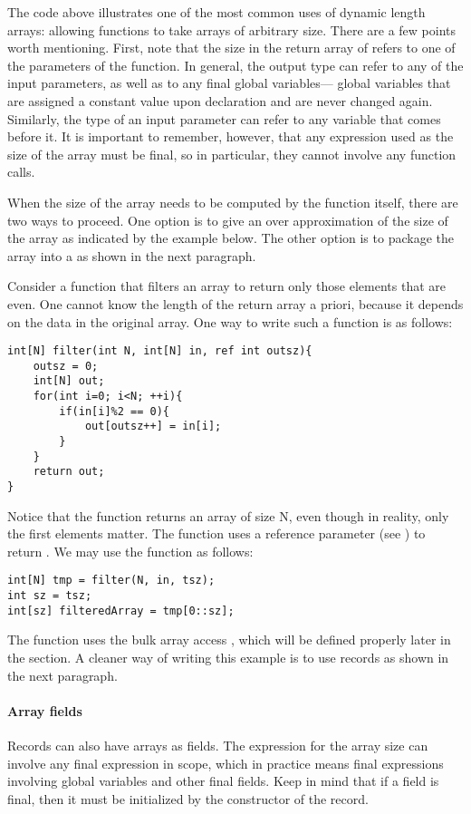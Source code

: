 The code above illustrates one of the most common uses of dynamic length arrays: allowing functions to take arrays of arbitrary size. There are a few points worth mentioning. First, note that the size in the return array of  refers to one of the parameters of the function. In general, the output type can refer to any of the input parameters, as well as to any final global variables---\ie{} global variables that are assigned a constant value upon declaration and are never changed again. Similarly, the type of an input parameter can refer to any variable that comes before it. It is important to remember, however, that any expression used as the size of the array must be final, so in particular, they cannot involve any function calls.

When the size of the array needs to be computed by the function itself, there are two ways to proceed. One option is to give an over approximation of the size of the array as indicated by the example below. The other option is to package the array into a  as shown in the next paragraph.

\begin{Example}
Consider a function that filters an array to return only those elements that are even. One cannot know the length of the return array a priori, because it depends on the data in the original array. One way to write such a function is as follows:
\begin{lstlisting}
int[N] filter(int N, int[N] in, ref int outsz){
	outsz = 0;
	int[N] out;
	for(int i=0; i<N; ++i){ 
		if(in[i]%2 == 0){
			out[outsz++] = in[i];			
		}
	}
	return out;
}
\end{lstlisting}
Notice that the function returns an array of size N, even though in reality, only the first  elements matter. The function uses a reference parameter (see ) to return .
We may use the function as follows:
\begin{lstlisting}
int[N] tmp = filter(N, in, tsz);
int sz = tsz;
int[sz] filteredArray = tmp[0::sz];
\end{lstlisting}
The function uses the bulk array access , which will be defined properly later in the section. A cleaner way of writing this example is to use records as shown in the next paragraph.
\end{Example}

\paragraph{Array fields}
Records can also have arrays as fields. The expression for the array size can involve any final expression in scope, which in practice means final expressions involving global variables and other final fields. Keep in mind that if a field is final, then it must be initialized by the constructor of the record. 

